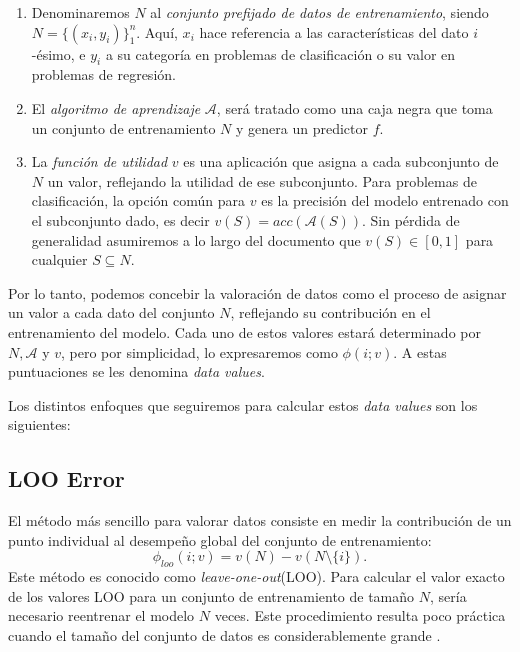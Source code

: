 \begin{enumerate}
  \item  Denominaremos $N$ al \emph{conjunto prefijado de datos
  de entrenamiento}, siendo $N = \{ (x_i, y_i) \}_1^n$.
  Aquí, $x_i$ hace referencia a las características del dato
  $i$-ésimo, e $y_i$ a su categoría en problemas de
  clasificación o su valor en problemas de regresión.
  
  \item El \emph{algoritmo de aprendizaje}  $\mathcal{A}$,
  será tratado como una caja negra que toma un conjunto de
  entrenamiento $N$ y genera un predictor $f$.
  
  \item La \emph{función de utilidad} $v$ es una aplicación
  que asigna a cada subconjunto de $N$ un valor, reflejando
  la utilidad de ese subconjunto. Para problemas de clasificación,
  la opción común para $v$ es la precisión del modelo
  entrenado con el subconjunto dado, es decir
  $v(S) = acc (\mathcal{A} (S))$. Sin pérdida de generalidad
  asumiremos a lo largo del documento que $v (S) \in [0, 1]$
  para cualquier $S \subseteq N$.
\end{enumerate}

Por lo tanto, podemos concebir la valoración de datos como el
proceso de asignar un valor a cada dato del conjunto $N$,
reflejando su contribución en el entrenamiento del modelo.
Cada uno de estos valores estará determinado por $N,
\mathcal{A}$ y $v$, pero por simplicidad, lo expresaremos
como $\phi(i ; v)$. A estas puntuaciones se les denomina
\textit{data values}.

Los distintos enfoques que seguiremos para calcular estos
\textit{data values} son los siguientes:

\subsection*{LOO Error}

El método más sencillo para valorar datos consiste en medir la
contribución de un punto individual al desempeño global del
conjunto de entrenamiento:
\[
  \phi_{{loo}} (i ; v) = v (N) - v (N \setminus \{i\}).
\]
Este método es conocido como \textit{leave-one-out}(LOO).
Para calcular el valor exacto de los valores LOO para
un conjunto de entrenamiento de tamaño $N$, sería
necesario reentrenar el modelo $N$ veces. Este procedimiento
resulta poco práctica cuando el tamaño del conjunto de datos
es considerablemente grande \cite{looFuck}.

